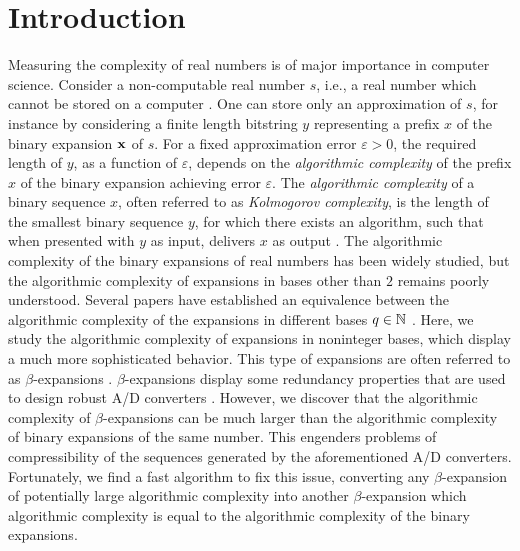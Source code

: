
\section{Introduction}

\noindent Measuring the complexity of real numbers is of major importance in computer science. Consider a non-computable real number $s$, i.e., a real number which cannot be stored on a computer \cite[Section 10]{copeland2004computable}. One can store only an approximation of $s$, for instance by considering a finite length bitstring $y$ representing a prefix $x$ of the binary expansion ${\bf x}$ of $s$. For a fixed approximation error $\varepsilon>0$, the required length of $y$, as a function of $\varepsilon$, depends on the \textit{algorithmic complexity} of the prefix $x$ of the binary expansion achieving error $\varepsilon$. The \textit{algorithmic complexity} of a binary sequence $x$, often referred to as \textit{Kolmogorov complexity}, is the length of the smallest binary sequence $y$, for which there exists an algorithm, such that when presented with $y$ as input, delivers $x$ as output \cite[Definition 10.1]{balcazar2012structural}\cite[Section 14.2]{cover1999elements}\cite[Definition 2.1.2]{li2008introduction}. The algorithmic complexity of the binary expansions of real numbers has been widely studied, but the algorithmic complexity of expansions in bases other than $2$ remains poorly understood. Several papers have established an equivalence between the algorithmic complexity of the expansions in different bases $q \in \mathbb{N}$ \cite[Theorem 6.1]{calude2005randomness}\cite[Theorem 5.1]{hertling1998randomness}\cite[Theorem 3]{staiger2002kolmogorov}. Here, we study the algorithmic complexity of expansions in noninteger bases, which display a much more sophisticated behavior. This type of expansions are often referred to as $\beta$-expansions \cite[(1)]{parry1960beta}\cite[Section 4]{renyi1957representations}. $\beta$-expansions display some redundancy properties that are used to design robust A/D converters \cite{daubechies2002beta}\cite{daubechies2006imperfect}\cite{daubechies2010GoldenRatioEncoder}. However, we discover that the algorithmic complexity of $\beta$-expansions can be much larger than the algorithmic complexity of binary expansions of the same number. This engenders problems of compressibility of the sequences generated by the aforementioned A/D converters. Fortunately, we find a fast algorithm to fix this issue, converting any $\beta$-expansion of potentially large algorithmic complexity into another $\beta$-expansion which algorithmic complexity is equal to the algorithmic complexity of the binary expansions.

